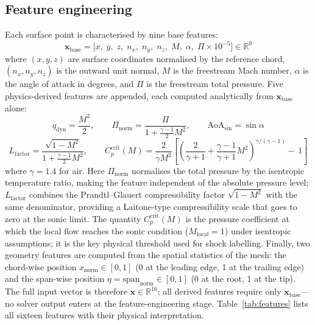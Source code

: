 \documentclass{WCCM-ECCOMAS_2026_Full_Paper}
\begin{document}
\subsection{Feature engineering}

Each surface point is characterised by nine base features:
\begin{equation}
  \mathbf{x}_{\mathrm{base}}
  = \bigl[x,\;y,\;z,\;n_x,\;n_y,\;n_z,\;M,\;\alpha,\;
          \Pi{\times}10^{-5}\bigr]
  \in \mathbb{R}^{9}
  \label{eq:xbase}
\end{equation}
where $(x,y,z)$ are surface coordinates normalised by the reference
chord, $(n_x,n_y,n_z)$ is the outward unit normal, $M$ is the
freestream Mach number, $\alpha$ is the angle of attack in degrees,
and $\Pi$ is the freestream total pressure.  Five physics-derived
features are appended, each computed analytically from
$\mathbf{x}_{\mathrm{base}}$ alone:
\begin{equation}
  q_{\mathrm{dyn}} = \frac{M^{2}}{2},
  \qquad
  \Pi_{\mathrm{norm}} = \frac{\Pi}{1+\tfrac{\gamma-1}{2}M^{2}},
  \qquad
  \mathrm{AoA}_{\sin} = \sin\alpha
  \label{eq:derived1}
\end{equation}
\begin{equation}
  L_{\mathrm{factor}} =
    \frac{\sqrt{1-M^{2}}}{1+\tfrac{\gamma-1}{2}M^{2}},
  \qquad
  C_{p}^{\mathrm{crit}}(M) =
    \frac{2}{\gamma M^{2}}\!\left[
      \left(\frac{2}{\gamma+1}+\frac{\gamma-1}{\gamma+1}M^{2}\right)^{\!\!
        \gamma/(\gamma-1)}\!\!\!-\,1\right]
  \label{eq:cpcrit}
\end{equation}
where $\gamma = 1.4$ for air.  Here $\Pi_{\mathrm{norm}}$ normalises
the total pressure by the isentropic temperature ratio, making the
feature independent of the absolute pressure level; $L_{\mathrm{factor}}$
combines the Prandtl--Glauert compressibility factor $\sqrt{1-M^{2}}$
with the same denominator, providing a Laitone-type compressibility
scale that goes to zero at the sonic limit.  The quantity $C_{p}^{\mathrm{crit}}(M)$ is the
pressure coefficient at which the local flow reaches the sonic
condition ($M_{\mathrm{local}}=1$) under isentropic assumptions; it
is the key physical threshold used for shock labelling.  Finally, two
geometry features are computed from the spatial statistics of the
mesh: the chord-wise position $x_{\mathrm{norm}}\in[0,1]$ (0 at the
leading edge, 1 at the trailing edge) and the span-wise position
$\eta = \mathrm{span}_{\mathrm{norm}}\in[0,1]$ (0 at the root, 1 at
the tip).  The full input vector is therefore
$\mathbf{x}\in\mathbb{R}^{16}$; all derived features require only
$\mathbf{x}_{\mathrm{base}}$---no solver output enters at the
feature-engineering stage.  Table~\ref{tab:features} lists all
sixteen features with their physical interpretation.
\end{document}
